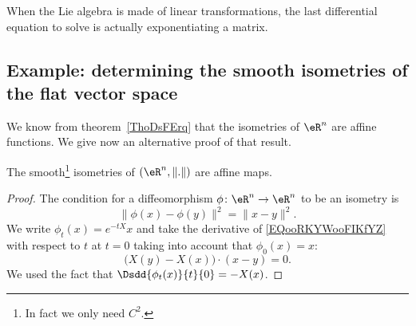 \begin{theorem}
\begin{remark}
	When the Lie algebra is made of linear transformations, the last differential equation to solve is actually exponentiating a matrix.
\end{remark}

\subsection{Example: determining the smooth isometries of the flat vector space}

We know from theorem~\ref{ThoDsFErq} that the isometries of \( \eR^n\) are affine functions. We give now an alternative proof of that result.

\begin{proposition}     \label{PROPooDVIWooAFDNPy}
	The smooth\footnote{In fact we only need \( C^2\).} isometries of \( (\eR^n,\| . \|)  \)  are affine maps.
\end{proposition}

\begin{proof}
	The condition for a diffeomorphism \( \phi\colon \eR^n\to \eR^n\) to be an isometry is
	\begin{equation}        \label{EQooRKYWooFIKfYZ}
		\| \phi(x)- \phi(y) \|^2=\| x-y \|^2.
	\end{equation}
	We write \( \phi_t(x)= e^{-tX}x\) and take the derivative of \eqref{EQooRKYWooFIKfYZ} with respect to \( t\) at \( t=0\) taking into account that \( \phi_0(x)=x\):
	\begin{equation}        \label{EQooXEKMooGOktOj}
		\big( X(y)-X(x) \big)\cdot (x-y)=0.
	\end{equation}
	We used the fact that \( \Dsdd{ \phi_t(x) }{t}{0}=-X(x)\).


\end{proof}
\end{theorem}
